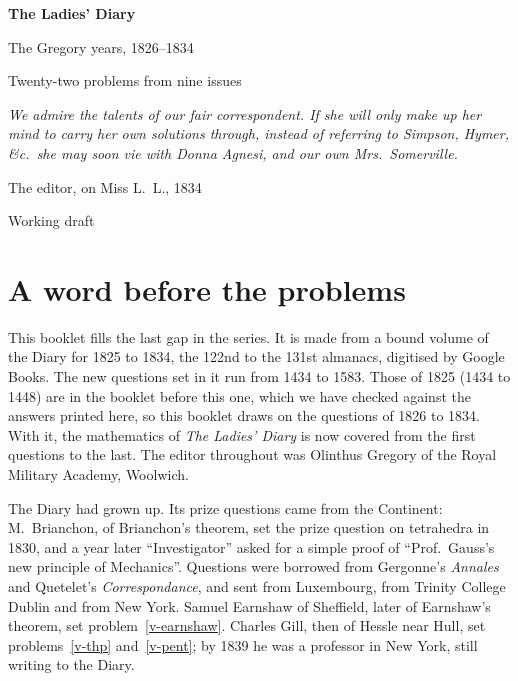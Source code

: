 \documentclass[11pt,a4paper]{article}
\newcounter{prob}
\begin{document}
\begin{titlepage}
\centering
\vspace*{3cm}
{\Huge\bfseries The Ladies' Diary\par}
\vspace{0.4cm}
{\LARGE The Gregory years, 1826--1834\par}
\vspace{0.8cm}
{\Large Twenty-two problems from nine issues\par}
\vspace{2cm}
{\large\itshape We admire the talents of our fair correspondent. If she will only make
up her mind to carry her own solutions through, instead of referring to Simpson, Hymer,
\&c.\ she may soon vie with Donna Agnesi, and our own Mrs.\ Somerville.\par}
\vspace{0.3cm}
{\small The editor, on Miss L.~L., 1834\par}
\vfill
{\large Working draft\par}
\end{titlepage}

\section*{A word before the problems}

This booklet fills the last gap in the series. It is made from a bound volume of the Diary
for 1825 to 1834, the 122nd to the 131st almanacs, digitised by Google Books. The new
questions set in it run from 1434 to 1583. Those of 1825 (1434 to 1448) are in the
booklet before this one, which we have checked against the answers printed here, so this
booklet draws on the questions of 1826 to 1834. With it, the
mathematics of \textit{The Ladies' Diary} is now covered from the first questions to the
last. The editor throughout was Olinthus Gregory of the Royal Military Academy, Woolwich.

The Diary had grown up. Its prize questions came from the Continent: M.~Brianchon, of
Brianchon's theorem, set the prize question on tetrahedra in 1830, and a year later
``Investigator'' asked for a simple proof of ``Prof.\ Gauss's new principle of
Mechanics''. Questions were borrowed from Gergonne's \textit{Annales} and Quetelet's
\textit{Correspondance}, and sent from Luxembourg, from Trinity College Dublin and from
New York. Samuel Earnshaw of Sheffield, later of Earnshaw's theorem, set
problem~\ref{v-earnshaw}. Charles Gill, then of Hessle near Hull, set
problems~\ref{v-thp} and~\ref{v-pent}; by 1839 he was a professor in New York, still
writing to the Diary.
\end{document}
